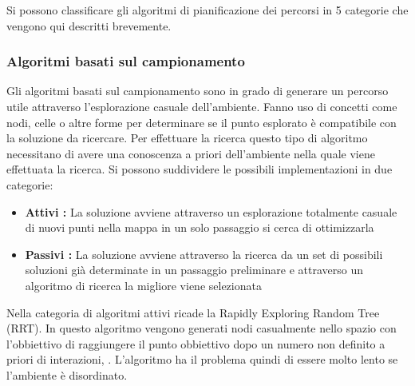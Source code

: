 Si possono classificare gli algoritmi di pianificazione dei percorsi in 5 categorie che vengono qui descritti brevemente.

\subsubsection{Algoritmi basati sul campionamento}

Gli algoritmi basati sul campionamento sono in grado di generare un percorso utile attraverso l'esplorazione casuale dell'ambiente. Fanno uso di concetti come nodi, celle o altre forme per determinare se il punto esplorato è compatibile con la soluzione da ricercare. Per effettuare la ricerca questo tipo di algoritmo necessitano di avere una conoscenza a priori dell'ambiente nella quale viene effettuata la ricerca.
Si possono suddividere le possibili implementazioni in due categorie:
\begin{itemize}
	\item \textbf{Attivi : } La soluzione avviene attraverso un esplorazione totalmente casuale di nuovi punti nella mappa in un solo passaggio si cerca di ottimizzarla
	\item \textbf{Passivi : }  La soluzione avviene attraverso la ricerca da un set di possibili soluzioni già determinate in un passaggio preliminare e attraverso un algoritmo di ricerca la migliore viene selezionata
\end{itemize}





Nella categoria di algoritmi attivi ricade la Rapidly Exploring Random Tree (RRT). In questo algoritmo vengono generati nodi casualmente nello spazio con l'obbiettivo di raggiungere il punto obbiettivo dopo un numero non definito a priori di interazioni, \cite{Lavalle98rapidly-exploringrandom}. L'algoritmo ha il problema quindi di essere molto lento se l'ambiente è disordinato.

